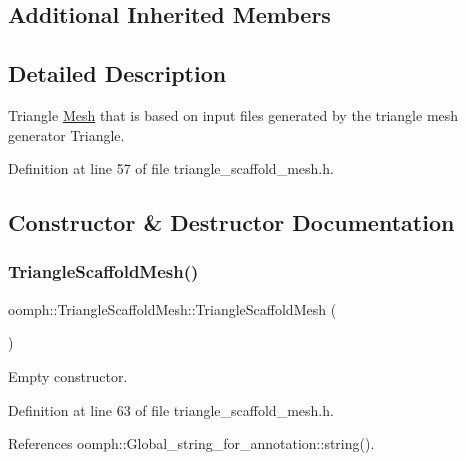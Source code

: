 \subsection*{Additional Inherited Members}


\subsection{Detailed Description}
Triangle \hyperlink{classoomph_1_1Mesh}{Mesh} that is based on input files generated by the triangle mesh generator Triangle. 

Definition at line 57 of file triangle\+\_\+scaffold\+\_\+mesh.\+h.



\subsection{Constructor \& Destructor Documentation}
\mbox{\label{classoomph_1_1TriangleScaffoldMesh_a804e5432620818f020ff4c8148da32a0}} 
\subsubsection{\texorpdfstring{Triangle\+Scaffold\+Mesh()}{TriangleScaffoldMesh()}\hspace{0.1cm}{\footnotesize\ttfamily [1/4]}}
{\footnotesize\ttfamily oomph\+::\+Triangle\+Scaffold\+Mesh\+::\+Triangle\+Scaffold\+Mesh (\begin{DoxyParamCaption}{ }\end{DoxyParamCaption})\hspace{0.3cm}{\ttfamily [inline]}}



Empty constructor. 



Definition at line 63 of file triangle\+\_\+scaffold\+\_\+mesh.\+h.



References oomph\+::\+Global\+\_\+string\+\_\+for\+\_\+annotation\+::string().

\mbox{\label{classoomph_1_1TriangleScaffoldMesh_a78a4ea139165dfd742f89fc362f5fc13}} 

